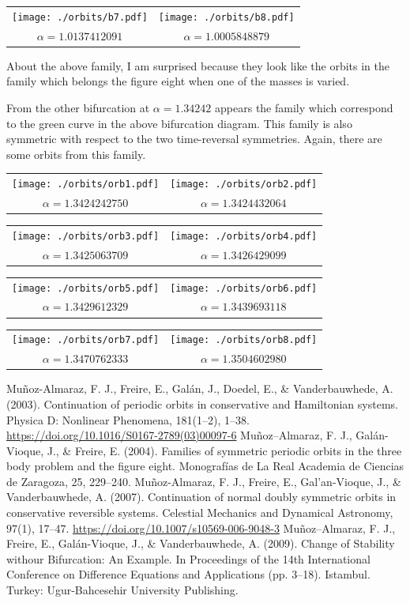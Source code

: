 \documentclass{article}
\begin{document}
\begin{tabular}{cc}
\texttt{[image: ./orbits/b7.pdf]}&
\texttt{[image: ./orbits/b8.pdf]}\\
$\alpha= 1.0137412091$&$ \alpha= 1.0005848879$
\end{tabular}

About the above family, I am surprised because they look like the orbits in the family which belongs the figure eight when one of the  masses is varied. 

From the other bifurcation  at $\alpha= 1.34242$ appears the family which correspond to the green curve in the above bifurcation diagram. This family is also symmetric with respect to the two time-reversal symmetries.  Again, there are some orbits from this family.

\begin{tabular}{cc}
\texttt{[image: ./orbits/orb1.pdf]}&
\texttt{[image: ./orbits/orb2.pdf]}\\
$\alpha=1.3424242750 $&$ \alpha=1.3424432064 $
\end{tabular}

\begin{tabular}{cc}
\texttt{[image: ./orbits/orb3.pdf]}&
\texttt{[image: ./orbits/orb4.pdf]}\\
$\alpha= 1.3425063709$&$ \alpha=1.3426429099 $
\end{tabular}

\begin{tabular}{cc}
\texttt{[image: ./orbits/orb5.pdf]}&
\texttt{[image: ./orbits/orb6.pdf]}\\
$\alpha=1.3429612329 $&$ \alpha=1.3439693118 $
\end{tabular}

\begin{tabular}{cc}
\texttt{[image: ./orbits/orb7.pdf]}&
\texttt{[image: ./orbits/orb8.pdf]}\\
$\alpha= 1.3470762333$&$ \alpha= 1.3504602980$
\end{tabular}

\begin{thebibliography}{99}
 Mu\~{n}oz-Almaraz, F. J., Freire, E., Gal\'an,
  J., Doedel, E., \& Vanderbauwhede, A. (2003). Continuation of
  periodic orbits in conservative and Hamiltonian systems. Physica D:
  Nonlinear Phenomena, 181(1–2),
  1–38. \url{https://doi.org/10.1016/S0167-2789(03)00097-6}
  Mu\~noz–Almaraz, F. J., Gal\'an-Vioque, J., \& Freire, E. (2004). Families of symmetric periodic orbits in the three body problem and the figure eight. Monograf\'ias de La Real Academia de Ciencias de Zaragoza, 25, 229–240.
   Mu\~noz-Almaraz, F. J., Freire, E., Gal'an-Vioque,
  J., \& Vanderbauwhede, A. (2007). Continuation of normal doubly
  symmetric orbits in conservative reversible systems. Celestial
  Mechanics and Dynamical Astronomy, 97(1),
  17–47. \url{https://doi.org/10.1007/s10569-006-9048-3}
  Mu\~noz–Almaraz, F. J., Freire, E., Gal\'an-Vioque, J., \& Vanderbauwhede, A. (2009). Change of Stability withour Bifurcation: An Example. In Proceedings of the 14th International Conference on Difference Equations and Applications (pp. 3–18). Istambul. Turkey: Ugur-Bahcesehir University Publishing.
\end{thebibliography}
\end{document}
